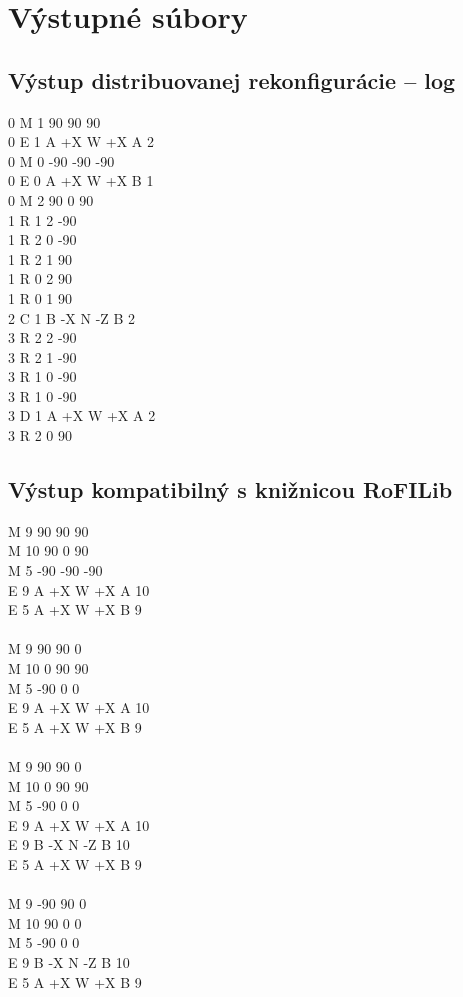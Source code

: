 \documentclass[
  digital, %
  oneside, %
  notable,   %
  lof,     %
  nolot,     %
]{fithesis3}
\begin{document}
\section{Výstupné súbory}
\subsection{Výstup distribuovanej rekonfigurácie -- log} 
\label{sec:log}
0 M 1 90 90 90 \\
0 E 1 A +X W +X A 2 \\
0 M 0 -90 -90 -90 \\
0 E 0 A +X W +X B 1 \\
0 M 2 90 0 90 \\
1 R 1 2 -90 \\
1 R 2 0 -90 \\
1 R 2 1 90 \\
1 R 0 2 90 \\
1 R 0 1 90 \\ 
2 C 1 B -X N -Z B 2 \\
3 R 2 2 -90 \\
3 R 2 1 -90 \\
3 R 1 0 -90 \\
3 R 1 0 -90 \\
3 D 1 A +X W +X A 2 \\
3 R 2 0 90 

\subsection{Výstup kompatibilný s knižnicou RoFILib}
M 9 90 90 90 \\
M 10 90 0 90 \\
M 5 -90 -90 -90 \\
E 9 A +X W +X A 10 \\
E 5 A +X W +X B 9 \\
\\
M 9 90 90 0 \\
M 10 0 90 90 \\
M 5 -90 0 0 \\
E 9 A +X W +X A 10 \\
E 5 A +X W +X B 9 \\
\\
M 9 90 90 0 \\
M 10 0 90 90 \\
M 5 -90 0 0 \\
E 9 A +X W +X A 10 \\
E 9 B -X N -Z B 10 \\
E 5 A +X W +X B 9 \\
\\
M 9 -90 90 0 \\
M 10 90 0 0 \\
M 5 -90 0 0 \\
E 9 B -X N -Z B 10 \\
E 5 A +X W +X B 9
\end{document}
